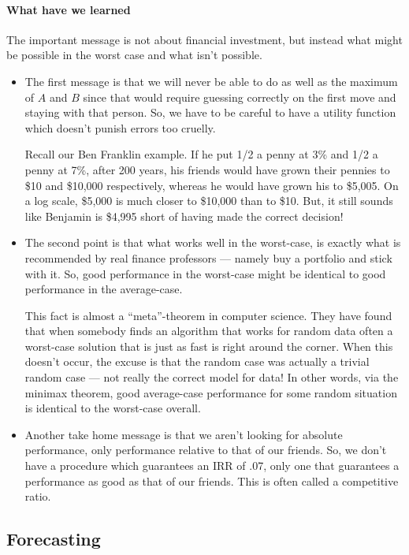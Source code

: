 \documentclass{book}
\begin{document}
\paragraph{What have we learned}  The important message is not about
financial investment, but instead what might be possible in the worst
case and what isn't possible. 
\begin{itemize}
\item The first message is that we will never be able to do as well as
the maximum of $A$ and $B$ since that would require guessing correctly
on the first move and staying with that person.  So, we have to be
careful to have a utility function which doesn't punish errors too
cruelly.

Recall our Ben Franklin example.  If he put 1/2 a penny at 3\% and
  1/2 a penny at 7\%, after 200 years, his friends would have grown
  their pennies to \$10 and \$10,000 respectively, whereas he would
  have grown his to \$5,005.  On a log scale, \$5,000 is much closer to
  \$10,000 than to \$10.  But, it still sounds like Benjamin is
  \$4,995 short of having made the correct decision!  


 \item The second point is that what works well in the worst-case, is
   exactly what is recommended by real finance professors --- namely
   buy a portfolio and stick with it.  So, good performance in the
   worst-case might be identical to good performance in the
   average-case.

   This fact is almost a ``meta''-theorem in computer science.  They
   have found that when somebody finds an algorithm that works for
   random data often a worst-case solution that is just as fast is
   right around the corner.  When this doesn't occur, the excuse is
   that the random case was actually a trivial random case --- not really
   the correct model for data!  In other words, via the minimax
   theorem, good average-case performance for some random situation is
   identical to the worst-case overall.
\item Another take home message is that we aren't looking for absolute
  performance, only performance relative to that of our friends.  So,
  we don't have a procedure which guarantees an IRR of .07, only one
  that guarantees a performance as good as that of our friends.  This
  is often called a competitive ratio.
\end{itemize}



        \subsection{Forecasting}
\end{document}
